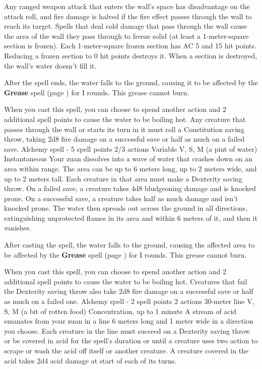         Any ranged weapon attack that enters the wall's space has disadvantage on the attack roll, and fire damage is halved if the fire effect passes through the wall to reach its target.
        Spells that deal cold damage that pass through the wall cause the area of the wall they pass through to freeze solid (at least a 1-meter-square section is frozen).
        Each 1-meter-square frozen section has AC 5 and 15 hit points.
        Reducing a frozen section to 0 hit points destroys it.
        When a section is destroyed, the wall's water doesn't fill it.

        After the spell ends, the water falls to the ground, causing it to be affected by the \textbf{Grease} spell (page \pageref{spell::grease}) for I rounds.
        This grease cannot burn.

        When you cast this spell, you can choose to spend another action and 2 additional spell points to cause the water to be boiling hot.
        Any creature that passes through the wall or starts its turn in it must roll a Constitution saving throw, taking 2d8 fire damage on a successful save or half as much on a failed save.
        {Alchemy spell - 5 spell points}
        {2/3 actions}
        {Variable}
        {V, S, M (a pint of water)}
        {Instantaneous}
        Your zuan dissolves into a wave of water that crashes down on an area within range.
        The area can be up to 6 meters long, up to 2 meters wide, and up to 2 meters tall.
        Each creature in that area must make a Dexterity saving throw.
        On a failed save, a creature takes 4d8 bludgeoning damage and is knocked prone.
        On a successful save, a creature takes half as much damage and isn't knocked prone.
        The water then spreads out across the ground in all directions, extinguishing unprotected flames in its area and within 6 meters of it, and then it vanishes.

        After casting the spell, the water falls to the ground, causing the affected area to be affected by the \textbf{Grease} spell (page \pageref{spell::grease}) for I rounds.
        This grease cannot burn.

        When you cast this spell, you can choose to spend another action and 2 additional spell points to cause the water to be boiling hot.
        Creatures that fail the Dexterity saving throw also take 2d8 fire damage on a successful save or half as much on a failed one.
        {Alchemy spell - 2 spell points}
        {2 actions}
        {30-meter line}
        {V, S, M (a bit of rotten food)}
        {Concentration, up to 1 minute}
        A stream of acid emanates from your zuan in a line 6 meters long and 1 meter wide in a direction you choose.
        Each creature in the line must succeed on a Dexterity saving throw or be covered in acid for the spell's duration or until a creature uses two action to scrape or wash the acid off itself or another creature.
        A creature covered in the acid takes 2d4 acid damage at start of each of its turns.

